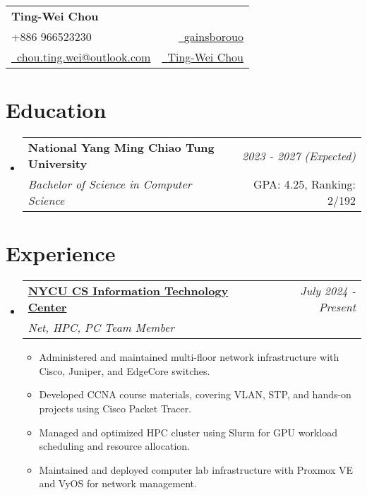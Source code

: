 \documentclass[a4paper,11pt]{article}
\makeatletter
\newcommand{\resumeSubheading}[4]{
\vspace{0.5mm}\item
    \begin{tabular*}{0.98\textwidth}[t]{l@{\extracolsep{\fill}}r}
        \textbf{#1} & \textit{\footnotesize{#4}} \\
        \textit{\footnotesize{#3}} &  \footnotesize{#2}\\
    \end{tabular*}
    \vspace{-2.4mm}
}
\newcommand{\resumeSubHeadingListStart}{\begin{itemize}[leftmargin=*,labelsep=0mm]}
\newcommand{\resumeItemListStart}{\begin{justify}\begin{itemize}[leftmargin=3ex, rightmargin=2ex, noitemsep,labelsep=1.2mm,itemsep=0mm]\small}
\newcommand{\resumeSubHeadingListEnd}{\end{itemize}\vspace{2mm}}
\newcommand{\resumeItemListEnd}{\end{itemize}\end{justify}\vspace{-2mm}}
\newcommand{\name}{Ting-Wei Chou} %
\newcommand{\phone}{966523230}
\newcommand{\emaila}{chou.ting.wei@outlook.com}
\makeatother
\begin{document}
\selectfont


\parbox{\dimexpr\linewidth-0.3cm\relax}{
\begin{tabularx}{\linewidth}{L r} \\
  \textbf{\Large \name} \\ 
  {\raisebox{0em}{\footnotesize \faPhone} +886 \phone} & \href{https://github.com/gainsborouo}{\raisebox{0.0\height}{\footnotesize \faGithub}\ {gainsborouo}}\\
  \href{mailto:\emaila}{\raisebox{0.0\height}{\footnotesize 
 \faEnvelope}\ {\emaila}}&\href{https://www.linkedin.com/in/userwei}{\raisebox{0.0\height}{\footnotesize \faLinkedin}\ {Ting-Wei Chou}}
\end{tabularx}
}

\section{\textbf{Education}}
  \resumeSubHeadingListStart
    \resumeSubheading
      {National Yang Ming Chiao Tung University}{GPA: 4.25, Ranking: 2/192}
      {Bachelor of Science in Computer Science}{2023 - 2027 (Expected)}
  \resumeSubHeadingListEnd
\vspace{-5.5mm}
%



\section{\textbf{Experience}}
  \resumeSubHeadingListStart
    \resumeSubheading
      {\href{https://www.linkedin.com/company/nycu-csit/}{NYCU CS Information Technology Center}}{}
      {Net, HPC, PC Team Member}{July 2024 - Present}
      \vspace{-2.0mm}
      \resumeItemListStart
        \item {Administered and maintained multi-floor network infrastructure with Cisco, Juniper, and EdgeCore switches.}
        \item {Developed CCNA course materials, covering VLAN, STP, and hands-on projects using Cisco Packet Tracer.}
        \item {Managed and optimized HPC cluster using Slurm for GPU workload scheduling and resource allocation.}
        \item {Maintained and deployed computer lab infrastructure with Proxmox VE and VyOS for network management.}
      \resumeItemListEnd
  \resumeSubHeadingListEnd
\vspace{-8.5mm}
\end{document}
